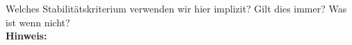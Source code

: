 \begin{question}[section=5,name={Stabilitätskriterium},difficulty=,type=mdl,tags={}]
	Welches Stabilitätskriterium verwenden wir hier implizit? Gilt dies immer? Was ist wenn nicht?
	\\ \textbf{Hinweis:}\\
	
\end{question}
\begin{solution}
	
\end{solution}